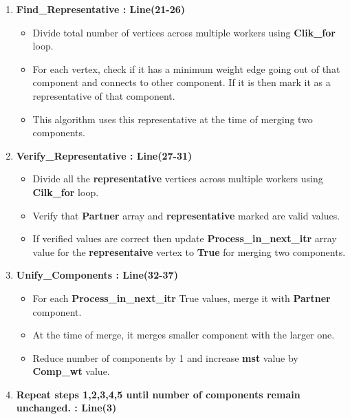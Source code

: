 \documentclass{article}
\begin{document}
\begin{enumerate}
\item \textbf{Find\_Representative : Line(21-26)}
\begin{itemize}
\item Divide total number of vertices across multiple workers using \textbf{Clik\_for} loop.\\
\item For each vertex, check if it has a minimum weight edge going out of that component and connects to other component. If it is then mark it as a representative of that component.\\
\item This algorithm uses this representative at the time of merging two components.\\
\end{itemize}

\item \textbf{Verify\_Representative : Line(27-31)}
\begin{itemize}
\item Divide all the \textbf{representative} vertices across multiple workers using \textbf{Cilk\_for} loop. \\
\item Verify that \textbf{Partner} array and \textbf{representative} marked are valid values. \\
\item If verified values are correct then update \textbf{Process\_in\_next\_itr} array value for the \textbf{representaive} vertex to \textbf{True} for merging two components. \\
\end{itemize}

\item \textbf{Unify\_Components : Line(32-37)}
\begin{itemize}
\item For each \textbf{Process\_in\_next\_itr} True values, merge it with \textbf{Partner} component. \\
\item At the time of merge, it merges smaller component with the larger one. \\
\item Reduce number of components by 1 and increase \textbf{mst} value by \textbf{Comp\_wt} value. \\
\end{itemize}

\item \textbf{Repeat steps 1,2,3,4,5 until number of components remain unchanged. : Line(3)}
\end{enumerate}
\end{document}
